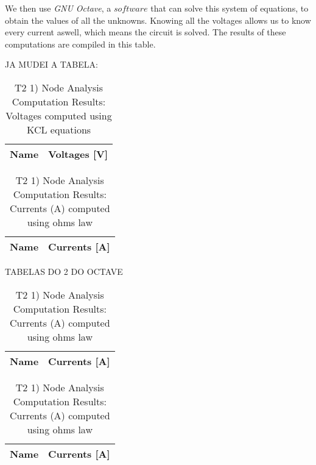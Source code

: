 We then use \textit{GNU Octave}, a $software$ that can solve this system of equations, to obtain the values of all the unknowns. Knowing all the voltages allows us to know every current aswell, which means the circuit is solved.
The results of these computations are compiled in this table.


JA MUDEI A TABELA:

\begin{table}[h]
  \centering
  \begin{tabular}{|l|r|}
    \hline    
    {\bf Name} & {\bf Voltages [V]} \\ \hline
    
  \end{tabular}
  \caption{T2 1) Node Analysis Computation Results: Voltages computed using KCL equations}
  \label{tab:nodeCurrents}
\end{table}


\begin{table}[h]
  \centering
  \begin{tabular}{|l|r|}
    \hline    
    {\bf Name} & {\bf Currents [A]} \\ \hline
    
  \end{tabular}
  \caption{T2 1) Node Analysis Computation Results: Currents (A) computed using ohms law}
  \label{tab:nodeCurrents}
\end{table}

TABELAS DO 2 DO OCTAVE

\begin{table}[h]
  \centering
  \begin{tabular}{|l|r|}
    \hline    
    {\bf Name} & {\bf Currents [A]} \\ \hline
    
  \end{tabular}
  \caption{T2 1) Node Analysis Computation Results: Currents (A) computed using ohms law}
  \label{tab:nodeCurrents}
\end{table}

\begin{table}[h]
  \centering
  \begin{tabular}{|l|r|}
    \hline    
    {\bf Name} & {\bf Currents [A]} \\ \hline
    
  \end{tabular}
  \caption{T2 1) Node Analysis Computation Results: Currents (A) computed using ohms law}
  \label{tab:nodeCurrents}
\end{table}